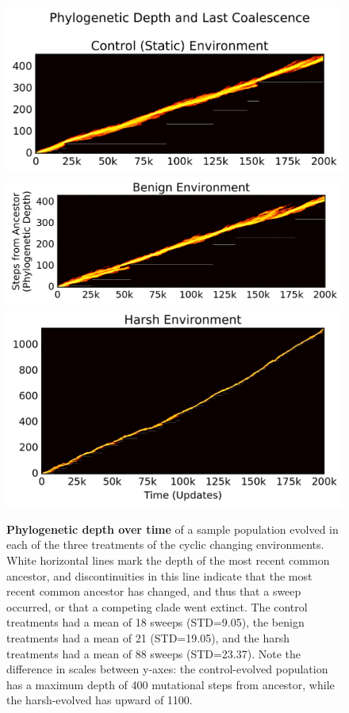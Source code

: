 \documentclass[PhD]{msu-thesis}
\begin{document}
	\begin{figure}[!h]
	\includegraphics[trim={-0.88cm 0 0.25cm 0},clip,width=0.65\columnwidth]{figures/CE/control__phylodepth_with_coalescense.png}
	\includegraphics[trim={0.2cm 0 0.25cm 0},clip,width=0.65\columnwidth]{figures/CE/benign__phylodepth_with_coalescense.png}
	\includegraphics[trim={-0.63cm 0 0.25cm 0},clip,width=0.65\columnwidth]{figures/CE/harsh__phylodepth_with_coalescense.png}
	\caption{\textbf{Phylogenetic depth over time} of a sample population evolved in each of the three treatments of the cyclic changing environments. White horizontal lines mark the depth of the most recent common ancestor, and discontinuities in this line indicate that the most recent common ancestor has changed, and thus that a sweep occurred, or that a competing clade went extinct. The control treatments had a mean of 18 sweeps (STD=9.05), the benign treatments had a mean of 21 (STD=19.05), and the harsh treatments had a mean of 88 sweeps (STD=23.37). Note the difference in scales between y-axes: the control-evolved population has a maximum depth of 400 mutational steps from ancestor, while the harsh-evolved has upward of 1100. %
	}\label{fig:flamegraph}
	\end{figure}
\end{document}

